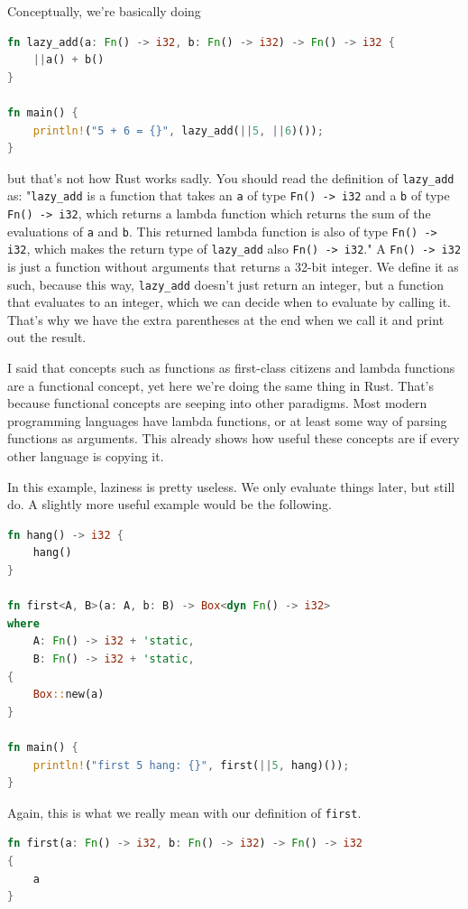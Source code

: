 \documentclass[11pt]{article}
\begin{document}
Conceptually, we're basically doing
\begin{lstlisting}[language=Rust]
fn lazy_add(a: Fn() -> i32, b: Fn() -> i32) -> Fn() -> i32 {
    ||a() + b()
}

fn main() {
    println!("5 + 6 = {}", lazy_add(||5, ||6)());
}
\end{lstlisting}

but that's not how Rust works sadly. You should read the definition of
\texttt{lazy\_add} as: "\texttt{lazy\_add} is a function that takes an
\texttt{a} of type \texttt{Fn() -> i32} and a \texttt{b} of type \texttt{Fn()
-> i32}, which returns a lambda function which returns the sum of the
evaluations of \texttt{a} and \texttt{b}. This returned lambda function is also
of type \texttt{Fn() -> i32}, which makes the return type of \texttt{lazy\_add}
also \texttt{Fn() -> i32}." A \texttt{Fn() -> i32} is just a function without
arguments that returns a 32-bit integer. We define it as such, because this
way, \texttt{lazy\_add} doesn't just return an integer, but a function that
evaluates to an integer, which we can decide when to evaluate by calling it.
That's why we have the extra parentheses at the end when we call it and print
out the result.

I said that concepts such as functions as first-class citizens and lambda
functions are a functional concept, yet here we're doing the same thing in
Rust. That's because functional concepts are seeping into other paradigms. Most
modern programming languages have lambda functions, or at least some way of
parsing functions as arguments. This already shows how useful these concepts
are if every other language is copying it.

In this example, laziness is pretty useless. We only evaluate things later, but
still do. A slightly more useful example would be the following.
\begin{lstlisting}[language=Rust]
fn hang() -> i32 {
    hang()
}

fn first<A, B>(a: A, b: B) -> Box<dyn Fn() -> i32>
where
    A: Fn() -> i32 + 'static,
    B: Fn() -> i32 + 'static,
{
    Box::new(a)
}

fn main() {
    println!("first 5 hang: {}", first(||5, hang)());
}
\end{lstlisting}
Again, this is what we really mean with our definition of \texttt{first}.
\begin{lstlisting}[language=Rust]
fn first(a: Fn() -> i32, b: Fn() -> i32) -> Fn() -> i32
{
    a
}
\end{lstlisting}
\end{document}
